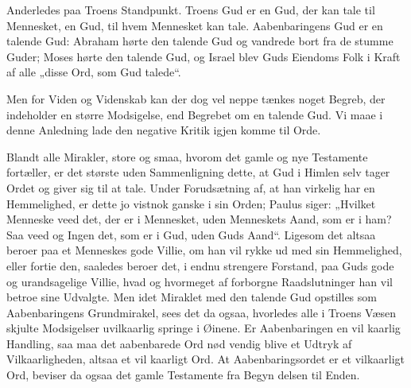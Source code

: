 \documentclass[12pt]{book}
\newcommand{\opage}[1]{\marginnote{\footnotesize\textit{[#1]}}}
\begin{document}
Anderledes paa Troens Standpunkt. Troens Gud
er en Gud, der kan tale til Mennesket, en Gud, til hvem
Mennesket kan tale. Aabenbaringens Gud er en talende
Gud: Abraham hørte den talende Gud og vandrede
bort fra de stumme Guder; Moses hørte den talende
Gud, og Israel blev Guds Eiendoms Folk i Kraft af alle
„disse Ord, som Gud talede“.

\opage{178}\setcounter{footnote}{0}%
Men for Viden og Videnskab kan der dog vel neppe
tænkes noget Begreb, der indeholder en større Modsigelse,
end Begrebet om en talende Gud. Vi maae i denne
Anledning lade den negative Kritik igjen komme til
Orde.

Blandt alle Mirakler, store og smaa, hvorom det
gamle og nye Testamente fortæller, er det største uden
Sammenligning dette, at Gud i Himlen selv tager Ordet
og giver sig til at tale. Under Forudsætning af, at han
virkelig har en Hemmelighed, er dette jo vistnok ganske
i sin Orden; Paulus siger: „Hvilket Menneske veed det,
der er i Mennesket, uden Menneskets Aand, som er i
ham? Saa veed og Ingen det, som er i Gud, uden Guds
Aand“. Ligesom det altsaa beroer paa et Menneskes
gode Villie, om han vil rykke ud med sin Hemmelighed,
eller fortie den, saaledes beroer det, i endnu strengere
Forstand, paa Guds gode og urandsagelige Villie, hvad
og hvormeget af forborgne Raadslutninger han vil betroe
sine Udvalgte. Men idet Miraklet med den talende Gud
opstilles som Aabenbaringens Grundmirakel, sees det da
ogsaa, hvorledes alle i Troens Væsen skjulte Modsigelser
uvilkaarlig springe i Øinene. Er Aabenbaringen en vil\-%
kaarlig Handling, saa maa det aabenbarede Ord nød\-%
vendig blive et Udtryk af Vilkaarligheden, altsaa et vil\-%
kaarligt Ord. At Aabenbaringsordet er et vilkaarligt
Ord, beviser da ogsaa det gamle Testamente fra Begyn\-%
delsen til Enden.
\end{document}
